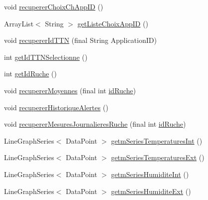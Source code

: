 \begin{DoxyCompactItemize}
\item 
void \hyperlink{classfr_1_1campus_1_1laurainc_1_1honeybee_1_1_ruche_ade5d681bd0a29d84e0d069169b10a38b}{recuperer\+Choix\+Ch\+App\+ID} ()
\item 
Array\+List$<$ String $>$ \hyperlink{classfr_1_1campus_1_1laurainc_1_1honeybee_1_1_ruche_a08d58dc3ce2db9adc37903c9b2f08977}{get\+Liste\+Choix\+App\+ID} ()
\item 
void \hyperlink{classfr_1_1campus_1_1laurainc_1_1honeybee_1_1_ruche_a1113f3b4a527a801fdf50350667fd212}{recuperer\+Id\+T\+TN} (final String Application\+ID)
\item 
int \hyperlink{classfr_1_1campus_1_1laurainc_1_1honeybee_1_1_ruche_a8c4c0db39c42733517035c4211e0ff95}{get\+Id\+T\+T\+N\+Selectionne} ()
\item 
int \hyperlink{classfr_1_1campus_1_1laurainc_1_1honeybee_1_1_ruche_ace3993bb5f36dc8c63f18bcc3ac75adf}{get\+Id\+Ruche} ()
\item 
void \hyperlink{classfr_1_1campus_1_1laurainc_1_1honeybee_1_1_ruche_a94f815b44f0d5d8682833d6b6e783713}{recuperer\+Moyennes} (final int \hyperlink{classfr_1_1campus_1_1laurainc_1_1honeybee_1_1_ruche_aee4d51dd1634b799427d89e168cdadf4}{id\+Ruche})
\item 
void \hyperlink{classfr_1_1campus_1_1laurainc_1_1honeybee_1_1_ruche_ace10a52a470257f2b8f161fc3c7b9f15}{recuperer\+Historique\+Alertes} ()
\item 
void \hyperlink{classfr_1_1campus_1_1laurainc_1_1honeybee_1_1_ruche_a84de3c3af21b1cbeae2075e480acaabc}{recuperer\+Mesures\+Journalieres\+Ruche} (final int \hyperlink{classfr_1_1campus_1_1laurainc_1_1honeybee_1_1_ruche_aee4d51dd1634b799427d89e168cdadf4}{id\+Ruche})
\item 
Line\+Graph\+Series$<$ Data\+Point $>$ \hyperlink{classfr_1_1campus_1_1laurainc_1_1honeybee_1_1_ruche_ae3f7d6c16444905061f13fe14eb21d69}{getm\+Series\+Temperatures\+Int} ()
\item 
Line\+Graph\+Series$<$ Data\+Point $>$ \hyperlink{classfr_1_1campus_1_1laurainc_1_1honeybee_1_1_ruche_ace771aab9a10f7cf13050197a85c41f7}{getm\+Series\+Temperatures\+Ext} ()
\item 
Line\+Graph\+Series$<$ Data\+Point $>$ \hyperlink{classfr_1_1campus_1_1laurainc_1_1honeybee_1_1_ruche_a2b57090da3912989bbfcc04a76f9e651}{getm\+Series\+Humidite\+Int} ()
\item 
Line\+Graph\+Series$<$ Data\+Point $>$ \hyperlink{classfr_1_1campus_1_1laurainc_1_1honeybee_1_1_ruche_ad1868fa7a9c8f7840e224b06eb03dac9}{getm\+Series\+Humidite\+Ext} ()

\end{DoxyCompactItemize}
